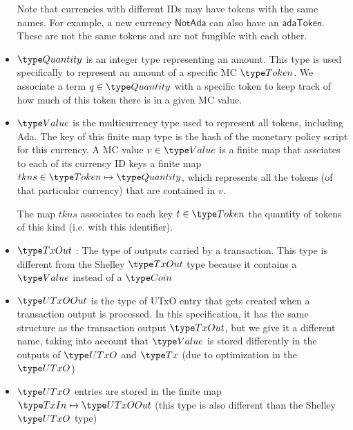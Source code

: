 \begin{itemize}
  Note that currencies with different IDs may have tokens with the same names.
  For example, a new currency $\mathsf{NotAda}$ can also have an $\mathsf{adaToken}$.
  These are not the same tokens and are not fungible with each other.

  \item $\Quantity$ is an integer type representing an amount. This type is used
  specifically to represent an amount of a specific MC $\Token$. We associate
  a term $q\in\Quantity$ with a specific token to keep track of how much of
  this token there is in a given MC value.

  \item $\Value$ is the multicurrency type used to represent
  all tokens, including Ada. The key of this finite map type is
  the hash of the monetary policy script for this currency.
  A MC value $v\in\Value$ is a finite map that assciates to each of its
  currency ID keys a finite map $tkns\in\Token \mapsto \Quantity$,
  which represents all the tokens (of that particular
  currency) that are contained in $v$.

  The map $tkns$ associates to each key $t\in\Token$ the quantity of tokens of
  this kind (i.e. with this identifier).

  \item $\TxOut$ : The type of outputs carried by a transaction. This type
  is different from the Shelley $\TxOut$ type because it contains a $\Value$
  instead of a $\Coin$

  \item $\UTxOOut$ is the type of UTxO entry that gets created when a transaction
  output is processed. In this specification, it has the same structure as
  the transaction output $\TxOut$, but we give it a different name, taking into
  account that $\Value$ is stored differently in the outputs of $\UTxO$ and $\Tx$
  (due to optimization in the $\UTxO$)

  \item $\UTxO$ entries are stored in the finite map $\TxIn\mapsto \UTxOOut$
  (this type is also different than the Shelley $\UTxO$ type)

\end{itemize}


